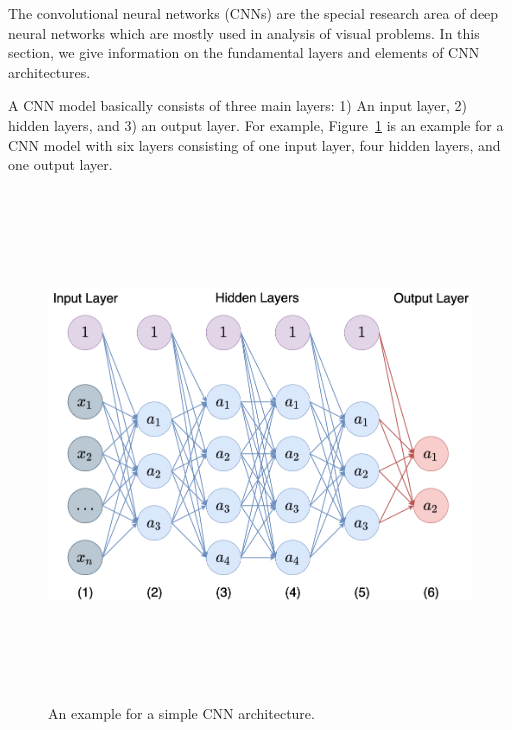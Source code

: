 The convolutional neural networks (CNNs) are the special research area of deep neural networks which are mostly used in analysis of visual problems. In this section, we give information on the fundamental layers and elements of CNN architectures. 

A CNN model basically consists of three main layers: 1) An input layer, 2) hidden layers, and 3) an output layer. For example, Figure~\ref{fig:basic_cnn_sample} is an example for a CNN model with six layers consisting of one input layer, four hidden layers, and one output layer.


\begin{figure}[h]
	\centering
	\includegraphics[width=13.5cm,height=13.5cm,keepaspectratio]{fig/simpleCNNarch.png}
	\vspace*{3mm}
	\caption{An example for a simple CNN architecture.}
	\label{fig:basic_cnn_sample}
\end{figure}



